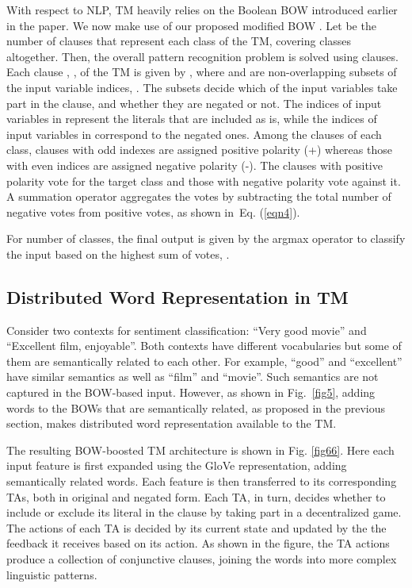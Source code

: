 \documentclass[11pt]{article}
\begin{document}
\par With respect to NLP, TM heavily relies on the Boolean BOW introduced earlier in the paper. We now make use of our proposed modified BOW . Let  be the number of clauses that represent each class of the TM, covering  classes altogether. Then, the overall pattern recognition problem is solved using  clauses. Each clause , ,  of the TM is given by , 
where  and  are non-overlapping subsets of the input variable indices, . The subsets decide which of the input variables take part in the clause, and whether they are negated or not. The indices of input variables in  represent the literals that are included as is, while the indices of input variables in  correspond to the negated ones. Among the  clauses of each class, clauses with odd indexes are assigned positive polarity (+) whereas those with even indices are assigned negative polarity (-). The clauses with positive polarity vote for the target class and those with negative polarity vote against it. A summation operator aggregates the votes by subtracting the total number of negative votes from positive votes, as shown in~Eq. (\ref{eqn4}). 

{\small
}

 For  number of classes, the final output  is given by the argmax operator to classify the input based on the highest sum of votes, . 

\subsection{Distributed Word Representation in TM}

Consider two contexts for sentiment classification: ``Very good movie'' and ``Excellent film, enjoyable''. Both contexts have different vocabularies but some of them are semantically related to each other. For example, ``good'' and ``excellent'' have similar semantics as well as ``film'' and ``movie''. Such semantics are not captured in the BOW-based input. However, as shown in Fig.~\ref{fig5}, adding words to the BOWs that are semantically related, as proposed in the previous section, makes distributed word representation available to the TM. 
\par    
 The resulting BOW-boosted TM architecture is shown in Fig. \ref{fig66}. Here each input feature is first expanded using the GloVe representation, adding semantically related words. Each feature is then transferred to its corresponding TAs, both in original and negated form. Each TA, in turn, decides whether to include or exclude its literal in the clause by taking part in a decentralized game. The actions of each TA is decided by its current state and updated by the the feedback it receives based on its action. As shown in the figure, the TA actions produce a collection of conjunctive clauses, joining the words into more complex linguistic patterns.
 
\end{document}
